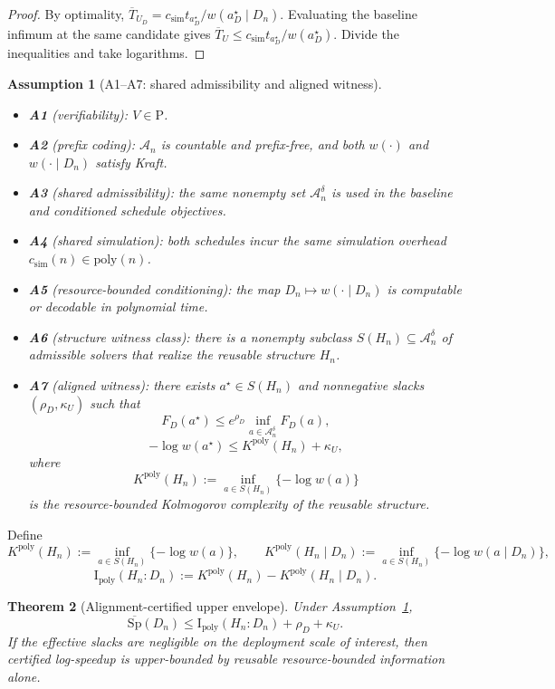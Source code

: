 \documentclass[10pt]{article}
\theoremstyle{paperplain}
\newtheorem{theorem}{Theorem}[section]
\theoremstyle{paperdefinition}
\newtheorem{assumption}[theorem]{Assumption}
\theoremstyle{paperremark}
\newcommand{\poly}{\mathrm{poly}}
\newcommand{\I}{\mathrm{I}}
\newcommand{\cA}{\mathcal{A}}
\newcommand{\Sp}{\mathrm{Sp}}
\begin{document}
\begin{proof}
By optimality,
$\overline T_{U_D}=c_{\mathrm{sim}}t_{a_D^\star}/w(a_D^\star\mid D_n)$.
Evaluating the baseline infimum at the same candidate gives
$\overline T_U\le c_{\mathrm{sim}}t_{a_D^\star}/w(a_D^\star)$.
Divide the inequalities and take logarithms.
\end{proof}

\begin{assumption}[A1--A7: shared admissibility and aligned witness]\label{ass:upper-envelope}
\leavevmode
\begin{itemize}
\item \textbf{A1} (verifiability): $V\in \mathrm{P}$.
\item \textbf{A2} (prefix coding): $\cA_n$ is countable and prefix-free, and both $w(\cdot)$ and $w(\cdot\mid D_n)$ satisfy Kraft.
\item \textbf{A3} (shared admissibility): the same nonempty set $\cA_n^\delta$ is used in the baseline and conditioned schedule objectives.
\item \textbf{A4} (shared simulation): both schedules incur the same simulation overhead $c_{\mathrm{sim}}(n)\in\poly(n)$.
\item \textbf{A5} (resource-bounded conditioning): the map $D_n\mapsto w(\cdot\mid D_n)$ is computable or decodable in polynomial time.
\item \textbf{A6} (structure witness class): there is a nonempty subclass $S(H_n)\subseteq \cA_n^\delta$ of admissible solvers that realize the reusable structure $H_n$.
\item \textbf{A7} (aligned witness): there exists $a^\star\in S(H_n)$ and nonnegative slacks $(\rho_D,\kappa_U)$ such that
\[
F_D(a^\star)\le e^{\rho_D}\inf_{a\in\cA_n^\delta}F_D(a),
\]
\[
-\log w(a^\star)\le K^{\poly}(H_n)+\kappa_U,
\]
where
\[
K^{\poly}(H_n):=\inf_{a\in S(H_n)}\{-\log w(a)\}
\]
is the resource-bounded Kolmogorov complexity of the reusable structure.
\end{itemize}
\end{assumption}

Define
\[
K^{\poly}(H_n):=\inf_{a\in S(H_n)}\{-\log w(a)\},
\qquad
K^{\poly}(H_n\mid D_n):=\inf_{a\in S(H_n)}\{-\log w(a\mid D_n)\},
\]
\[
\I_{\mathrm{poly}}(H_n:D_n):=K^{\poly}(H_n)-K^{\poly}(H_n\mid D_n).
\]

\begin{theorem}[Alignment-certified upper envelope]\label{thm:upper}\label{thm:upper-expectation}
Under Assumption~\ref{ass:upper-envelope},
\[
\overline{\Sp}(D_n)
\le
\I_{\mathrm{poly}}(H_n:D_n)+\rho_D+\kappa_U.
\]
If the effective slacks are negligible on the deployment scale of interest, then certified log-speedup is upper-bounded by reusable resource-bounded information alone.
\end{theorem}
\end{document}
